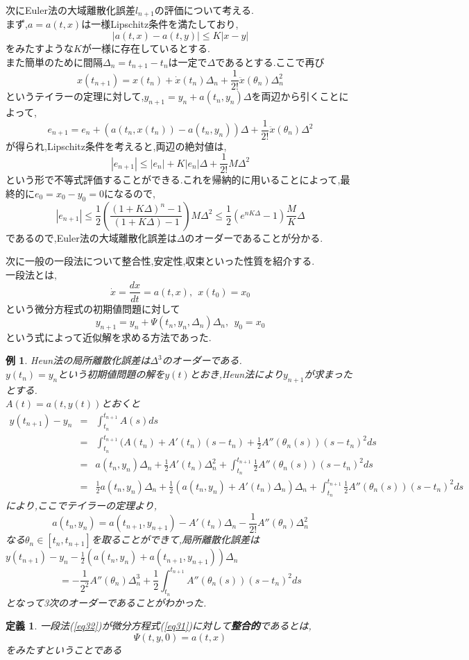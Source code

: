 \documentclass[a4paper,dvipdfmx]{jreport}
\numberwithin{equation}{section}
\newtheorem{Def}     [Thm]{定義}
\newtheorem{Ex}      [Thm]{例}
\renewenvironment{leftbar}{%
  \def\FrameCommand{\vrule width 1pt \hspace{10pt}}%
  \MakeFramed {\advance\hsize-\width \FrameRestore}}%
 {\endMakeFramed}
\def\defb{\begin{leftbar}\begin{Def}}
\def\defx{\end{Def}\end{leftbar}}
\def\ex{\begin{Ex}}
\def\exx{\end{Ex}}
\def\eq{\begin{equation}}
\def\eqx{\end{equation}}
\def\eqa{\begin{eqnarray}}
\def\eqax{\end{eqnarray}}
\begin{document}
次にEuler法の大域離散化誤差$l_{n+1}$の評価について考える.\\
まず,$a=a(t,x)$は一様Lipschitz条件を満たしており,
\[
|a(t,x) - a(t,y)| \le K |x-y|
\]
をみたすような$K$が一様に存在しているとする.\\
また簡単のために間隔$\Delta_n = t_{n+1} -t_n$は一定で$\Delta$であるとする.ここで再び
\[
x(t_{n+1}) = x(t_n) + \dot{x}(t_n)\Delta_n + \frac{1}{2!} \ddot{x}(\theta_n)\Delta_n^2
\]
というテイラーの定理に対して,$y_{n+1} = y_n + a(t_n,y_n)\Delta $を両辺から引くことによって,
\[
e_{n+1} = e_n + (a(t_n,x(t_n))-a(t_n,y_n))\Delta + \frac{1}{2!} \ddot{x}(\theta_n)\Delta^2
\]
が得られ,Lipschitz条件を考えると,両辺の絶対値は,
\[
|e_{n+1}| \le |e_n| + K|e_n|\Delta + \frac{1}{2!} M\Delta^2
\]
という形で不等式評価することができる.これを帰納的に用いることによって,最終的に$e_0 = x_0 - y_0 = 0$になるので,
\[
|e_{n+1}| \le \frac{1}{2} \left( \frac{(1+K\Delta)^n -1 }{(1+K\Delta)-1} \right)M\Delta^2 \le
\frac{1}{2} (e^{nK\Delta} -1) \frac{M}{K}\Delta
\]
であるので,Euler法の大域離散化誤差は$\Delta$のオーダーであることが分かる.\par
次に一般の一段法について整合性,安定性,収束といった性質を紹介する.\\
一段法とは,
\eq
\label{eq31}
\dot{x} = \frac{dx}{dt} = a(t,x), \  \  x(t_0) = x_0
\eqx
という微分方程式の初期値問題に対して
\eq
\label{eq32}
y_{n+1} = y_n + \Psi(t_n,y_n,\Delta_n) \Delta_n,\  \  y_0 = x_0
\eqx
という式によって近似解を求める方法であった.\\
\ex
Heun法の局所離散化誤差は$\Delta^3$のオーダーである.\\
$y(t_n) = y_n$という初期値問題の解を$y(t)$とおき,Heun法により$y_{n+1}$が求まったとする.\\
$A(t) =a(t,y(t))$とおくと
\eqa
y(t_{n+1}) - y_n &=& \int_{t_n}^{t_{n+1}} A(s)ds\\
&=& \int_{t_n}^{t_{n+1}} (A(t_n)+A'(t_n)(s-t_n)+\frac{1}{2} A''(\theta_n(s))(s-t_n)^2ds\\
&=& a(t_n,y_n)\Delta_n + \frac{1}{2} A'(t_n) \Delta^2_n +  \int_{t_n}^{t_{n+1}}  \frac{1}{2} A''(\theta_n(s))(s-t_n)^2ds\\
&=& \frac{1}{2} a(t_n,y_n)\Delta_n + \frac{1}{2} (a(t_n,y_n)+A'(t_{n})\Delta_n)\Delta_n +  \int_{t_n}^{t_{n+1}}  \frac{1}{2} A''(\theta_n(s))(s-t_n)^2ds
\eqax
により,ここでテイラーの定理より,
\[
a(t_n,y_n) = a(t_{n+1},y_{n+1}) - A'(t_n)\Delta_n - \frac{1}{2!} A''(\theta_n)\Delta_n^2
\]
なる$\theta_n\in [t_n , t_{n+1}]$を取ることができて,局所離散化誤差は
$y(t_{n+1}) - y_n - \frac{1}{2} (a(t_n,y_n)+a(t_{n+1},y_{n+1}))\Delta_n $
\[
= -\frac{1}{2^2} A''(\theta_n)\Delta^3_n + \frac{1}{2} \int_{t_n}^{t_{n+1}}  A''(\theta_n(s))(s-t_n)^2ds
\]
となって3次のオーダーであることがわかった.
\exx
\defb
一段法(\ref{eq32})が微分方程式(\ref{eq31})に対して{\bf 整合的}であるとは,\\
\[
\Psi(t,y,0)  = a(t,x)
\]
をみたすということである
\defx
\end{document}
